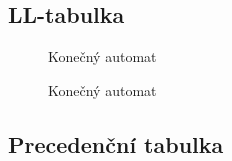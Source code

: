 \documentclass[a4paper]{article}
\begin{document}
\subsection{LL-tabulka}
\begin{landscape}
    \begin{figure}[p]
        \begin{center}
        \end{center}
        \caption{Konečný automat}
    \end{figure}
\end{landscape}

\begin{landscape}
    \begin{figure}[p]
        \begin{center}
        \end{center}
        \caption{Konečný automat}
    \end{figure}
\end{landscape}


\subsection{Precedenční tabulka}
\end{document}
